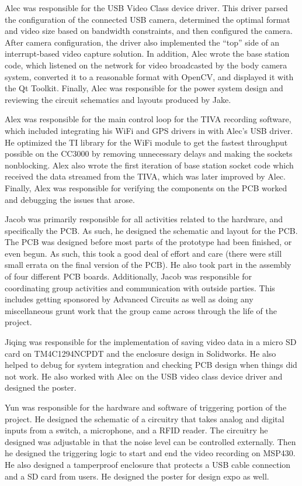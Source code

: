 \documentclass[12pt]{article}
\begin{document}
Alec was responsible for the USB Video Class device driver. This driver parsed
the configuration of the connected USB camera, determined the optimal format
and video size based on bandwidth constraints, and then configured the camera.
After camera configuration, the driver also implemented the “top” side of an
interrupt-based video capture solution. In addition, Alec wrote the base
station code, which listened on the network for video broadcasted by the body
camera system, converted it to a reasonable format with OpenCV, and displayed
it with the Qt Toolkit. Finally, Alec was responsible for the power system
design and reviewing the circuit schematics and layouts produced by Jake.

Alex was responsible for the main control loop for the TIVA recording software,
which included integrating his WiFi and GPS drivers in with Alec’s USB driver.
He optimized the TI library for the WiFi module to get the fastest throughput
possible on the CC3000 by removing unnecessary delays and making the sockets
nonblocking. Alex also wrote the first iteration of base station socket code
which received the data streamed from the TIVA, which was later improved by
Alec. Finally, Alex was responsible for verifying the components on the PCB
worked and debugging the issues that arose.

Jacob was primarily responsible for all activities related to the hardware, and
specifically the PCB. As such, he designed the schematic and layout for the
PCB. The PCB was designed before most parts of the prototype had been finished,
or even begun. As such, this took a good deal of effort and care (there were
still small errata on the final version of the PCB). He also took part in the
assembly of four different PCB boards. Additionally, Jacob was responsible for
coordinating group activities and communication with outside parties. This
includes getting sponsored by Advanced Circuits as well as doing any
miscellaneous grunt work that the group came across through the life of the
project.

Jiqing was responsible for the implementation of saving video data in a micro
SD card on TM4C1294NCPDT and the enclosure design in Solidworks. He also helped
to debug for system integration and checking PCB design when things did not
work. He also worked with Alec on the USB video class device driver and
designed the poster.

Yun was responsible for the hardware and software of triggering portion of the
project. He designed the schematic of a circuitry that takes analog and digital
inputs from a switch, a microphone, and a RFID reader. The circuitry he
designed was adjustable in that the noise level can be controlled externally.
Then he designed the triggering logic to start and end the video recording on
MSP430. He also designed a tamperproof enclosure that protects a USB cable
connection and a SD card from users. He designed the poster for design expo as
well.
\end{document}
